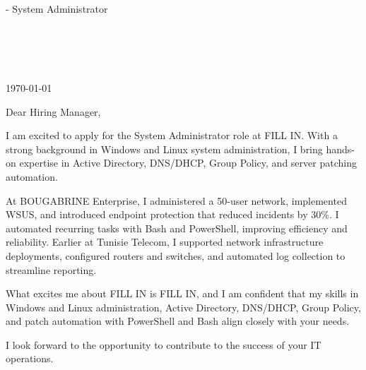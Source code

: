\documentclass[11pt,a4paper]{article}
\providecommand{\CompanyName}{FILL IN\xspace}
\providecommand{\HiringManager}{Hiring Manager\xspace}
\providecommand{\YourMotivation}{FILL IN\xspace}
\newcommand{\JobTitle}{System Administrator\xspace}
\providecommand{\JobKeywords}{Windows and Linux administration, Active Directory, DNS/DHCP, Group Policy, and patch automation with PowerShell and Bash\xspace}
\begin{document}
\begin{flushright}
    {\textbf{\FullName}} - \JobTitle \\
    \Phone \\
    \href{mailto:\Email}{\Email} \\
    \Location \\
    \LinkedIn \\
    \GitHub
\end{flushright}
\vspace{1em}
\today
\vspace{2em}


Dear \HiringManager,

I am excited to apply for the \JobTitle role at \CompanyName. With a strong background in Windows and Linux system administration, I bring hands-on expertise in Active Directory, DNS/DHCP, Group Policy, and server patching automation.

At BOUGABRINE Enterprise, I administered a 50-user network, implemented WSUS, and introduced endpoint protection that reduced incidents by 30\%. I automated recurring tasks with Bash and PowerShell, improving efficiency and reliability. Earlier at Tunisie Telecom, I supported network infrastructure deployments, configured routers and switches, and automated log collection to streamline reporting.

What excites me about \CompanyName is \YourMotivation, and I am confident that my skills in \JobKeywords align closely with your needs.

I look forward to the opportunity to contribute to the success of your IT operations.

\Signature  
\end{document}
